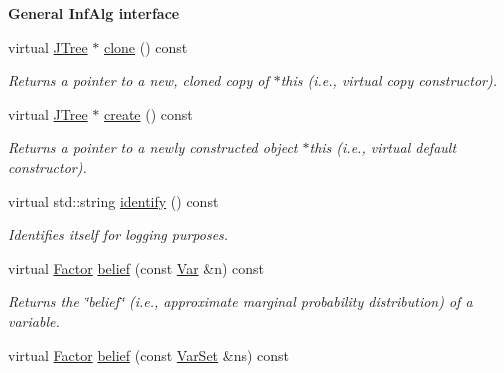 \begin{Indent}{\bf General InfAlg interface}\par
\begin{CompactItemize}
\item 
\hypertarget{classdai_1_1JTree_54c62d9fb8ac3f12b06343989c6fd398}{
virtual \hyperlink{classdai_1_1JTree}{JTree} $\ast$ \hyperlink{classdai_1_1JTree_54c62d9fb8ac3f12b06343989c6fd398}{clone} () const }
\label{classdai_1_1JTree_54c62d9fb8ac3f12b06343989c6fd398}

\begin{CompactList}\small\item\em Returns a pointer to a new, cloned copy of $\ast$this (i.e., virtual copy constructor). \item\end{CompactList}\item 
\hypertarget{classdai_1_1JTree_0a4a6ba17b04d274fec3dbebc6a2a6cb}{
virtual \hyperlink{classdai_1_1JTree}{JTree} $\ast$ \hyperlink{classdai_1_1JTree_0a4a6ba17b04d274fec3dbebc6a2a6cb}{create} () const }
\label{classdai_1_1JTree_0a4a6ba17b04d274fec3dbebc6a2a6cb}

\begin{CompactList}\small\item\em Returns a pointer to a newly constructed object $\ast$this (i.e., virtual default constructor). \item\end{CompactList}\item 
\hypertarget{classdai_1_1JTree_bc4d34db1bd656b35e430a1e26388aa1}{
virtual std::string \hyperlink{classdai_1_1JTree_bc4d34db1bd656b35e430a1e26388aa1}{identify} () const }
\label{classdai_1_1JTree_bc4d34db1bd656b35e430a1e26388aa1}

\begin{CompactList}\small\item\em Identifies itself for logging purposes. \item\end{CompactList}\item 
\hypertarget{classdai_1_1JTree_432cdc9cc9f4be26509e6bd2337c5325}{
virtual \hyperlink{classdai_1_1TFactor}{Factor} \hyperlink{classdai_1_1JTree_432cdc9cc9f4be26509e6bd2337c5325}{belief} (const \hyperlink{classdai_1_1Var}{Var} \&n) const }
\label{classdai_1_1JTree_432cdc9cc9f4be26509e6bd2337c5325}

\begin{CompactList}\small\item\em Returns the \char`\"{}belief\char`\"{} (i.e., approximate marginal probability distribution) of a variable. \item\end{CompactList}\item 
\hypertarget{classdai_1_1JTree_10de7513fea42d8c02be95a30bb69553}{
virtual \hyperlink{classdai_1_1TFactor}{Factor} \hyperlink{classdai_1_1JTree_10de7513fea42d8c02be95a30bb69553}{belief} (const \hyperlink{classdai_1_1VarSet}{VarSet} \&ns) const }
\label{classdai_1_1JTree_10de7513fea42d8c02be95a30bb69553}


\end{CompactItemize}
\end{Indent}

